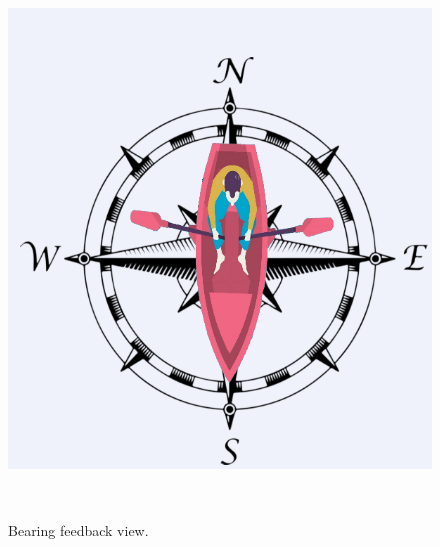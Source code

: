 \begin{figure}[H]
	\centering
	\begin{minipage}[c]{0.55\textwidth}
	\includegraphics[width=\textwidth]{Figures/compass.png}
	\caption{Bearing feedback view.}
	\label{feedback-compass}
	\end{minipage}
	~
	\begin{minipage}[c]{0.35\textwidth}

\end{minipage}
\end{figure}

